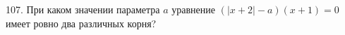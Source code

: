 107. При каком значении параметра $a$ уравнение $(|x+2|-a)(x+1)=0$ имеет ровно два различных корня?\\
